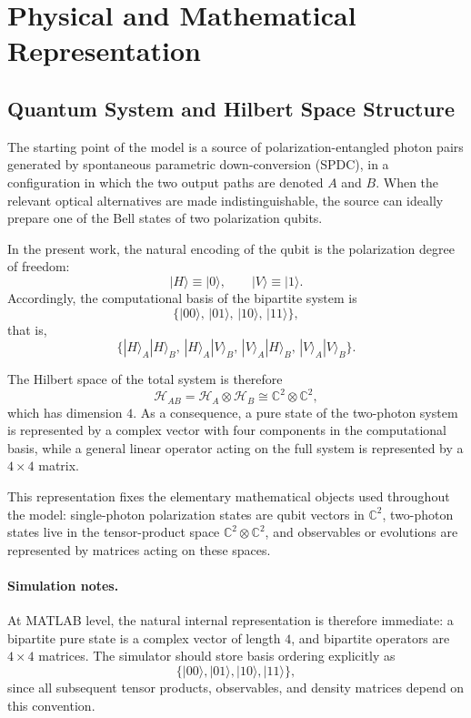 \documentclass[a4paper]{article}
\begin{document}
\section{Physical and Mathematical Representation}

\subsection{Quantum System and Hilbert Space Structure}

The starting point of the model is a source of polarization-entangled photon pairs generated by spontaneous parametric down-conversion (SPDC), in a configuration in which the two output paths are denoted \(A\) and \(B\). When the relevant optical alternatives are made indistinguishable, the source can ideally prepare one of the Bell states of two polarization qubits.

In the present work, the natural encoding of the qubit is the polarization degree of freedom:
\[
|H\rangle \equiv |0\rangle,
\qquad
|V\rangle \equiv |1\rangle.
\]
Accordingly, the computational basis of the bipartite system is
\[
\{
|00\rangle,\,
|01\rangle,\,
|10\rangle,\,
|11\rangle
\},
\]
that is,
\[
\{
|H\rangle_A |H\rangle_B,\,
|H\rangle_A |V\rangle_B,\,
|V\rangle_A |H\rangle_B,\,
|V\rangle_A |V\rangle_B
\}.
\]

The Hilbert space of the total system is therefore
\[
\mathcal{H}_{AB} = \mathcal{H}_A \otimes \mathcal{H}_B
\cong \mathbb{C}^2 \otimes \mathbb{C}^2,
\]
which has dimension \(4\). As a consequence, a pure state of the two-photon system is represented by a complex vector with four components in the computational basis, while a general linear operator acting on the full system is represented by a \(4 \times 4\) matrix.

This representation fixes the elementary mathematical objects used throughout the model: single-photon polarization states are qubit vectors in \(\mathbb{C}^2\), two-photon states live in the tensor-product space \(\mathbb{C}^2 \otimes \mathbb{C}^2\), and observables or evolutions are represented by matrices acting on these spaces.

\paragraph{Simulation notes.}
At MATLAB level, the natural internal representation is therefore immediate: a bipartite pure state is a complex vector of length \(4\), and bipartite operators are \(4 \times 4\) matrices. The simulator should store basis ordering explicitly as
\[
\{|00\rangle,|01\rangle,|10\rangle,|11\rangle\},
\]
since all subsequent tensor products, observables, and density matrices depend on this convention.
\end{document}
